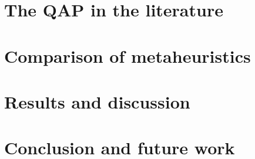   \section{The QAP in the literature} {
    \label{sec:literature-review}
    
  }

  \section{Comparison of metaheuristics} {
    \label{sec:methodology}
    
  }

  \section{Results and discussion} {
    \label{sec:results}
    
  }

  \section{Conclusion and future work} {
    \label{sec:conclusion}
    
  }

 \newpage
  
  


